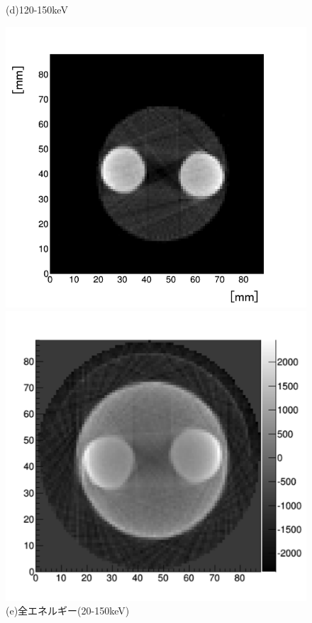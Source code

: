 \begin{figure}[H]
\begin{minipage}{0.5\hsize}
\begin{center}
  \end{center}
\vspace{-1cm}
\caption*{(d)120-150keV}
 \end{minipage}
 \begin{minipage}{0.5\hsize}
  \begin{center}
   \includegraphics[bb=0.000000 0.000000 314.853972 293.735718,width=1.0\hsize]{image2/chapter5/BH_all.png}
  \end{center}  
\vspace{-1cm}
\caption*{(e)全エネルギー(20-150keV)}
 \end{minipage}
  \begin{minipage}{0.5\hsize}
  \begin{center}
   \includegraphics[bb=0.000000 0.000000 241.900003 232.780757,width=1.0\hsize]{image2/chapter5/BH_APD.png}

\end{center}
\end{minipage}
\end{figure}
